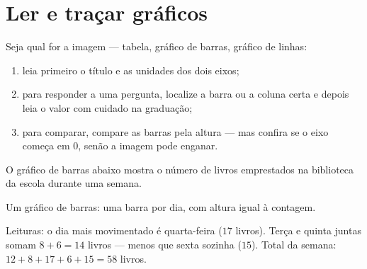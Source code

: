 \section{Ler e traçar gráficos}

\begin{method}\label{met:g6:propdata:read}
Seja qual for a imagem --- tabela, gráfico de barras, gráfico de
linhas:
\begin{enumerate}
  \item leia primeiro o título e as unidades dos dois eixos;
  \item para responder a uma pergunta, localize a barra ou a coluna
        certa e depois leia o valor com cuidado na graduação;
  \item para comparar, compare as barras pela altura --- mas confira se
        o eixo começa em $0$, senão a imagem pode enganar.
\end{enumerate}
\end{method}

\begin{example}\label{ex:g6:propdata:chart}
O gráfico de barras abaixo mostra o número de livros emprestados na
biblioteca da escola durante uma semana.

\begin{omfigure}

{\small Um gráfico de barras: uma barra por dia, com altura igual à
contagem.}
\end{omfigure}

Leituras: o dia mais movimentado é quarta-feira ($17$ livros). Terça e
quinta juntas somam $8 + 6 = 14$ livros --- menos que sexta sozinha
($15$). Total da semana: $12 + 8 + 17 + 6 + 15 = 58$ livros.
\end{example}

